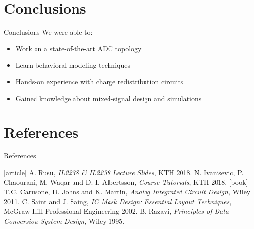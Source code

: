 \documentclass{beamer}
\begin{document}
 \section{Conclusions}
 \begin{frame}{Conclusions}
  We were able to:\vspace*{2em}
  \begin{itemize}
   \item Work on a state-of-the-art ADC topology
   \item<2-> Learn behavioral modeling techniques
   \item<3-> Hands-on experience with charge redistribution circuits
   \item<4-> Gained knowledge about mixed-signal design and simulations
  \end{itemize}
 \end{frame}

 \section{References}
 \begin{frame}{References}
  \begin{thebibliography}{9}
    [article]
    A. Rusu, {\textit{IL2238 \& IL2239 Lecture Slides}}, KTH 2018.
    N. Ivanisevic, P. Chaourani, M. Waqar and D. I. Albertsson, \textit{{Course Tutorials}}, KTH 2018.
    [book]
    T.C. Carusone, D. Johns and K. Martin, {\textit{Analog Integrated Circuit Design}}, Wiley 2011.
    C. Saint and J. Saing, {\textit{IC Mask Design: Essential Layout Techniques}}, McGraw-Hill Professional Engineering 2002.
    B. Razavi, \textit{Principles of Data Conversion System Design}, Wiley 1995.
  \end{thebibliography}
 \end{frame}
\end{document}
